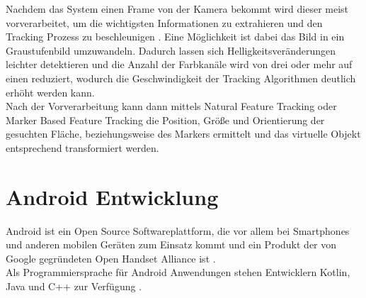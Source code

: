 Nachdem das System einen Frame von der Kamera bekommt wird dieser meist vorverarbeitet, um die wichtigsten Informationen zu extrahieren und den Tracking Prozess zu beschleunigen \citep[S. 5]{cukovic:marker-vs-natural}. Eine Möglichkeit ist dabei das Bild in ein Graustufenbild umzuwandeln. Dadurch lassen sich Helligkeitsveränderungen leichter detektieren und die Anzahl der Farbkanäle wird von drei oder mehr auf einen reduziert, wodurch die Geschwindigkeit der Tracking Algorithmen deutlich erhöht werden kann.\\
Nach der Vorverarbeitung kann dann mittels Natural Feature Tracking oder Marker Based Feature Tracking die Position, Größe und Orientierung der gesuchten Fläche, beziehungsweise des Markers ermittelt und das virtuelle Objekt entsprechend transformiert werden.

\section{Android Entwicklung}
Android ist ein Open Source Softwareplattform, die vor allem bei Smartphones und anderen mobilen Geräten zum Einsatz kommt und ein Produkt der von Google gegründeten Open Handset Alliance ist \citep[S. 4]{gargenta:learning-android}. \\
Als Programmiersprache für Android Anwendungen stehen Entwicklern Kotlin, Java und C++ zur Verfügung \citep{android:fundamentals}.

